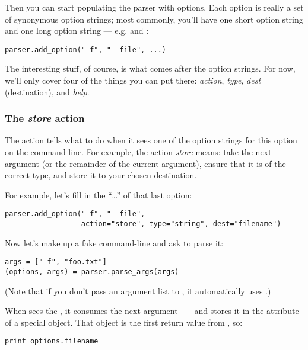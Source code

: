 Then you can start populating the parser with options.  Each option is
really a set of synonymous option strings; most commonly, you'll have
one short option string and one long option string ---
e.g.  and :

\begin{verbatim}
parser.add_option("-f", "--file", ...)
\end{verbatim}

The interesting stuff, of course, is what comes after the option
strings.  For now, we'll only cover four of the things you can put
there: \emph{action}, \emph{type}, \emph{dest} (destination), and
\emph{help}.

\subsubsection{The \emph{store} action%
               \label{optparse-store-action}}

The action tells  what to do when it sees one of the
option strings for this option on the command-line.  For example, the
action \emph{store} means: take the next argument (or the remainder of
the current argument), ensure that it is of the correct type, and
store it to your chosen destination.

For example, let's fill in the ``...'' of that last option:

\begin{verbatim}
parser.add_option("-f", "--file",
                  action="store", type="string", dest="filename")
\end{verbatim}

Now let's make up a fake command-line and ask  to
parse it:

\begin{verbatim}
args = ["-f", "foo.txt"]
(options, args) = parser.parse_args(args)
\end{verbatim}

(Note that if you don't pass an argument list to
, it automatically uses .)

When  sees the , it consumes the next
argument------and stores it in the 
attribute of a special object.  That object is the first return value
from , so:

\begin{verbatim}
print options.filename
\end{verbatim}

